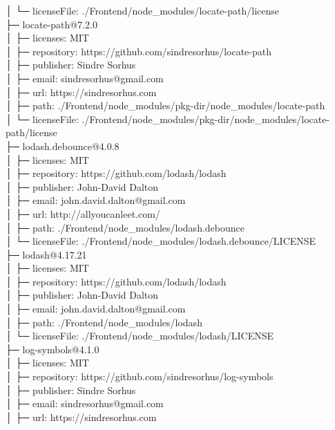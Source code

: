 \documentclass[
    paper=a4,
    twoside=false,
    parskip=half,
    listof=entryprefix,
    listof=totoc,
    index=totoc,
    bibliography=totoc,
    headsepline,
]{scrbook}
\begin{document}
    │  └─ licenseFile: ./Frontend/node\_modules/locate-path/license\\
    ├─ locate-path@7.2.0\\
    │  ├─ licenses: MIT\\
    │  ├─ repository: https://github.com/sindresorhus/locate-path\\
    │  ├─ publisher: Sindre Sorhus\\
    │  ├─ email: sindresorhus@gmail.com\\
    │  ├─ url: https://sindresorhus.com\\
    │  ├─ path: ./Frontend/node\_modules/pkg-dir/node\_modules/locate-path\\
    │  └─ licenseFile: ./Frontend/node\_modules/pkg-dir/node\_modules/locate-path/license\\
    ├─ lodash.debounce@4.0.8\\
    │  ├─ licenses: MIT\\
    │  ├─ repository: https://github.com/lodash/lodash\\
    │  ├─ publisher: John-David Dalton\\
    │  ├─ email: john.david.dalton@gmail.com\\
    │  ├─ url: http://allyoucanleet.com/\\
    │  ├─ path: ./Frontend/node\_modules/lodash.debounce\\
    │  └─ licenseFile: ./Frontend/node\_modules/lodash.debounce/LICENSE\\
    ├─ lodash@4.17.21\\
    │  ├─ licenses: MIT\\
    │  ├─ repository: https://github.com/lodash/lodash\\
    │  ├─ publisher: John-David Dalton\\
    │  ├─ email: john.david.dalton@gmail.com\\
    │  ├─ path: ./Frontend/node\_modules/lodash\\
    │  └─ licenseFile: ./Frontend/node\_modules/lodash/LICENSE\\
    ├─ log-symbols@4.1.0\\
    │  ├─ licenses: MIT\\
    │  ├─ repository: https://github.com/sindresorhus/log-symbols\\
    │  ├─ publisher: Sindre Sorhus\\
    │  ├─ email: sindresorhus@gmail.com\\
    │  ├─ url: https://sindresorhus.com\\
\end{document}
